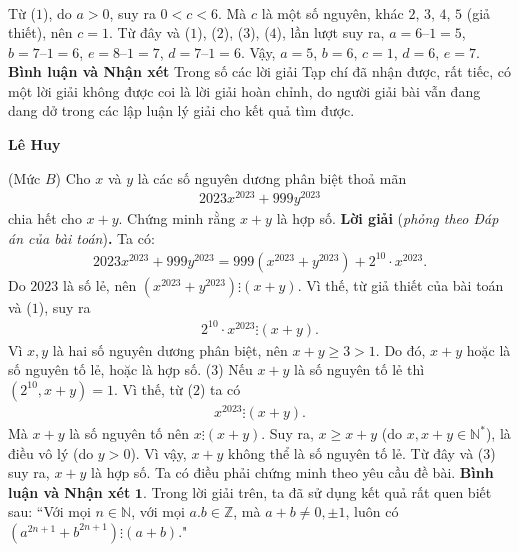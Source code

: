 \begin{multicols}{2}
\begin{align*}
	\end{align*}
	Từ ($1$), do $a > 0$, suy ra $0 < c < 6$. Mà $c$ là một số nguyên, khác $2$, $3$, $4$, $5$ (giả thiết), nên $c = 1$. Từ đây và ($1$), ($2$), ($3$), ($4$), lần lượt suy ra, $a = 6 – 1 = 5$, $b = 7 – 1 = 6$, $e = 8 – 1 = 7$, $d = 7 – 1 = 6$.
	\vskip 0.05cm
	Vậy, $a = 5$, $b = 6$, $c = 1$, $d = 6$, $e = 7$.
	\vskip 0.05cm
	\textbf{Bình luận và Nhận xét}
	\vskip 0.05cm
	Trong số các lời giải Tạp chí đã nhận được, rất tiếc, có một lời giải không được coi là lời giải hoàn chỉnh, do người giải bài vẫn đang dang dở trong các lập luận lý giải cho kết quả tìm được.
	\begin{flushright}
		\textbf{Lê Huy}
	\end{flushright}
	{}
	(Mức $B$) Cho $x$ và $y$ là các số nguyên dương phân biệt thoả mãn
	\begin{align*}
		2023x^{2023}+999 y^{2023}
	\end{align*}
	chia hết cho $x+y$. Chứng minh rằng $x+y$ là hợp số. 
	\vskip 0.05cm
	\textbf{Lời giải} (\textit{phỏng theo Đáp án của bài toán})\textbf{.}
	\vskip 0.05cm
	Ta có:
	\begin{align*}
		2023{x^{2023}} + 999{y^{2023}} = 999\left( {{x^{2023}} + {y^{2023}}} \right) + {2^{10}} \cdot {x^{2023}}.
	\end{align*}
	Do $2023$ là số lẻ, nên $\left( {{x^{2023}} + {y^{2023}}} \right) \vdots \left( {x + y} \right)$. Vì thế, từ giả thiết của bài toán và ($1$), suy ra
	\begin{align*}
		{2^{10}} \cdot {x^{2023}} \vdots \left( {x + y} \right).
	\end{align*}
	Vì $x, y$ là hai số nguyên dương phân biệt, nên $x + y \ge  3 > 1$. Do đó, $x + y$ hoặc là số nguyên tố lẻ, hoặc là hợp số.  
	\hfill ($3$)
	\vskip 0.05cm
	Nếu $x + y$ là số nguyên tố lẻ thì $\left( {{2^{10}},x + y} \right) = 1$.  Vì thế, từ ($2$) ta có
	\begin{align*}
		{x^{2023}} \vdots \left( {x + y} \right).
	\end{align*}
	Mà $x + y$ là số nguyên tố nên $x \vdots \left( {x + y} \right)$.  Suy ra, $x \ge  x + y$ (do $x, x + y \in \mathbb{N^*}$), là điều vô lý (do $y > 0$). Vì vậy, $x + y$ không thể là số nguyên tố lẻ. Từ đây và ($3$) suy ra, $x + y$ là hợp số.
	\vskip 0.05cm
	Ta có điều phải chứng minh theo yêu cầu đề bài.
	\vskip 0.05cm
	\textbf{Bình luận và Nhận xét}
	\vskip 0.05cm
	$\pmb{1.}$ Trong lời giải trên, ta đã sử dụng kết quả rất quen biết sau:
	\vskip 0.05cm
	``Với mọi $n \in \mathbb{N}$, với mọi  $a.b \in \mathbb{Z}$, mà $a + b \ne  0, \pm 1$, luôn có  $\left( {{a^{2n + 1}} + {b^{2n + 1}}} \right) \vdots \left( {a + b} \right).$"

\end{multicols}
